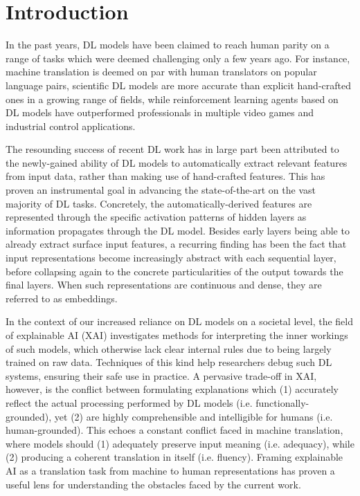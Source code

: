 \section{Introduction}\label{sec:introduction}

In the past years, DL models have been claimed to reach human parity on a range of tasks which were deemed challenging only a few years ago. For instance, machine translation is deemed on par with human translators on popular language pairs, scientific DL models are more accurate than explicit hand-crafted ones in a growing range of fields, while reinforcement learning agents based on DL models have outperformed professionals in multiple video games and industrial control applications.

The resounding success of recent DL work has in large part been attributed to the newly-gained ability of DL models to automatically extract relevant features from input data, rather than making use of hand-crafted features. This has proven an instrumental goal in advancing the state-of-the-art on the vast majority of DL tasks. Concretely, the automatically-derived features are represented through the specific activation patterns of hidden layers as information propagates through the DL model. Besides early layers being able to already extract surface input features, a recurring finding has been the fact that input representations become increasingly abstract with each sequential layer, before collapsing again to the concrete particularities of the output towards the final layers. When such representations are continuous and dense, they are referred to as embeddings.

In the context of our increased reliance on DL models on a societal level, the field of explainable AI (XAI) investigates methods for interpreting the inner workings of such models, which otherwise lack clear internal rules due to being largely trained on raw data. Techniques of this kind help researchers debug such DL systems, ensuring their safe use in practice. A pervasive trade-off in XAI, however, is the conflict between formulating explanations which (1) accurately reflect the actual processing performed by DL models (i.e. functionally-grounded), yet (2) are highly comprehensible and intelligible for humans (i.e. human-grounded). This echoes a constant conflict faced in machine translation, where models should (1) adequately preserve input meaning (i.e. adequacy), while (2) producing a coherent translation in itself (i.e. fluency). Framing explainable AI as a translation task from machine to human representations has proven a useful lens for understanding the obstacles faced by the current work.


